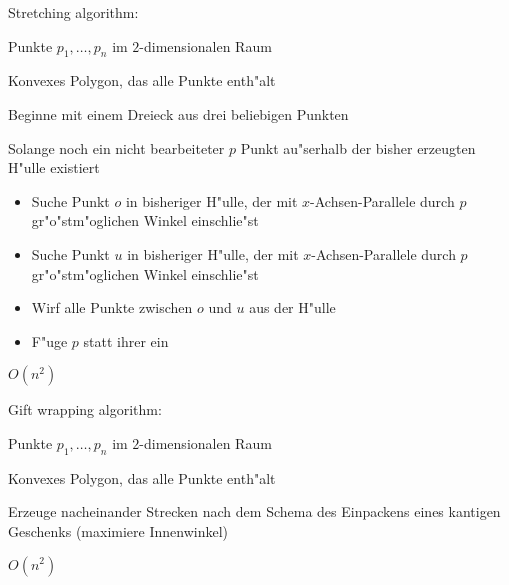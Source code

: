 \algorithm Stretching algorithm:{
  \given Punkte $p_1,\ldots,p_n$ im $2$-dimensionalen Raum
  
  \aim Konvexes Polygon, das alle Punkte enth"alt
  
  \begin{proc}
    \item Beginne mit einem Dreieck aus drei beliebigen Punkten
    \item Solange noch ein nicht bearbeiteter $p$ Punkt au"serhalb der 
      bisher erzeugten H"ulle existiert
      \begin{itemize}
        \item Suche Punkt $o$ in bisheriger H"ulle, der mit $x$-Achsen-Parallele
          durch $p$ gr"o"stm"oglichen Winkel einschlie"st
        \item Suche Punkt $u$ in bisheriger H"ulle, der mit $x$-Achsen-Parallele
          durch $p$ gr"o"stm"oglichen Winkel einschlie"st
        \item Wirf alle Punkte zwischen $o$ und $u$ aus der H"ulle
        \item F"uge $p$ statt ihrer ein
      \end{itemize}
  \end{proc}
  
  \cpx $O(n^2)$
}
\algorithm Gift wrapping algorithm:{
  \given Punkte $p_1,\ldots,p_n$ im $2$-dimensionalen Raum
  
  \aim Konvexes Polygon, das alle Punkte enth"alt
  
  \begin{proc}
    \item Erzeuge nacheinander Strecken nach dem Schema des Einpackens
      eines kantigen Geschenks (maximiere Innenwinkel)
  \end{proc}

  \cpx $O(n^2)$
}
